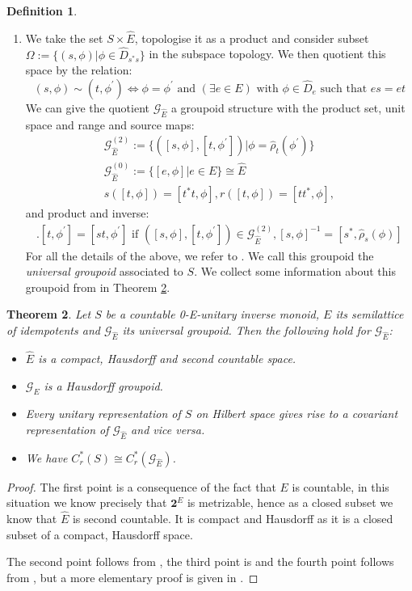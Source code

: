 \documentclass[11pt]{amsart}
\theoremstyle{plain}
\newtheorem{theorem}{Theorem}%
\theoremstyle{definition}%
\newtheorem{definition}[theorem]{Definition}%
\theoremstyle{remark}%
\newcommand{\G}{\mathcal{G}}
\newcommand{\E}{\widehat{E}}
\begin{document}
\begin{definition}
\begin{enumerate}
\item We take the set $S \times \E$, topologise it as a product and consider subset $\Omega:= \lbrace (s, \phi) | \phi \in \widehat{D}_{s^{*}s} \rbrace$ in the subspace topology. We then quotient this space by the relation:
\begin{equation*}
(s, \phi) \sim (t, \phi^{'}) \Leftrightarrow \phi=\phi^{'} \mbox{ and } (\exists e \in E) \mbox{ with } \phi \in \widehat{D}_{e} \mbox{ such that } es=et
\end{equation*}
We can give the quotient $\G_{\E}$ a groupoid structure with the product set, unit space and range and source maps:
\begin{eqnarray*}
\G_{\E}^{(2)}:=\lbrace ([s,\phi],[t,\phi^{'}]) | \phi=\widehat{\rho}_{t}(\phi^{'}) \rbrace \\
\G_{\E}^{(0)}:= \lbrace [e,\phi] | e \in E \rbrace \cong \E \\
s([t,\phi])=[t^{*}t,\phi], r([t,\phi])=[tt^{*},\phi], 
\end{eqnarray*}
and product and inverse:
\begin{eqnarray*}
[s,\phi].[t,\phi^{'}]= [st,\phi^{'}] \mbox{ if } ([s,\phi],[t,\phi^{'}]) \in \G_{\E}^{(2)}, [s,\phi]^{-1} = [s^{*},\widehat{\rho}_{s}(\phi)] 
\end{eqnarray*}
For all the details of the above, we refer to \cite[Section 4]{MR2419901}. We call this groupoid the \textit{universal groupoid} associated to $S$. We collect some information about this groupoid from \cite{MR2419901,MR1724106} in Theorem \ref{Thm:Info}.
\end{enumerate}
\end{definition}

\begin{theorem}\label{Thm:Info}
Let $S$ be a countable 0-E-unitary inverse monoid, $E$ its semilattice of idempotents and $\G_{\E}$ its universal groupoid. Then the following hold for $\G_{\E}$:
\begin{itemize}
\item $\E$ is a compact, Hausdorff and second countable space.
\item $\G_{\E}$ is a Hausdorff groupoid.
\item Every unitary representation of $S$ on Hilbert space gives rise to a covariant representation of $\G_{\E}$ and vice versa.
\item We have $C^{*}_{r}(S) \cong C^{*}_{r}(\G_{\E})$.
\end{itemize}
\end{theorem}
\begin{proof}
The first point is a consequence of the fact that $E$ is countable, in this situation we know precisely that $\textbf{2}^{E}$ is metrizable, hence as a closed subset we know that $\E$ is second countable. It is compact and Hausdorff as it is a closed subset of a compact, Hausdorff space.

The second point follows from \cite[Corollary 10.9]{MR2419901}, the third point is \cite[Corollary 10.16]{MR2419901} and the fourth point follows from \cite{MR1724106}, but a more elementary proof is given in \cite{MR1900993}.
\end{proof}
\end{document}
